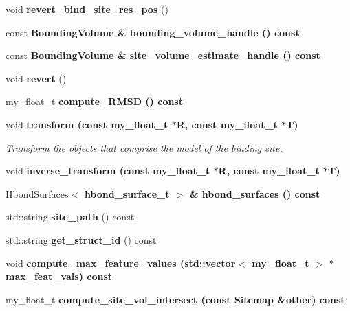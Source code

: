 \begin{CompactItemize}
\item 
void \textbf{revert\_\-bind\_\-site\_\-res\_\-pos} ()\label{classSimSite3D_1_1Sitemap_2411adae66ef848c5bfe67d55c07e672}

\item 
const \bf{Bounding\-Volume} \& \textbf{bounding\_\-volume\_\-handle} () const \label{classSimSite3D_1_1Sitemap_3ba92f5ed263d28b96b29085c197abed}

\item 
const \bf{Bounding\-Volume} \& \textbf{site\_\-volume\_\-estimate\_\-handle} () const \label{classSimSite3D_1_1Sitemap_ad6269d1f92809bbf093a0c6f6c8442a}

\item 
void \textbf{revert} ()\label{classSimSite3D_1_1Sitemap_85a7198a79dd727691347e20c5ffffef}

\item 
my\_\-float\_\-t \bf{compute\_\-RMSD} () const 
\item 
void \bf{transform} (const my\_\-float\_\-t $\ast$R, const my\_\-float\_\-t $\ast$T)\label{classSimSite3D_1_1Sitemap_5dc7a050ffc9ae70c203cb31e41b4b77}

\begin{CompactList}\small\item\em Transform the objects that comprise the model of the binding site. \item\end{CompactList}\item 
void \bf{inverse\_\-transform} (const my\_\-float\_\-t $\ast$R, const my\_\-float\_\-t $\ast$T)
\item 
Hbond\-Surfaces$<$ \bf{hbond\_\-surface\_\-t} $>$ \& \textbf{hbond\_\-surfaces} () const \label{classSimSite3D_1_1Sitemap_9e75ff867b2874ad6365c5c67c27a941}

\item 
std::string \textbf{site\_\-path} () const \label{classSimSite3D_1_1Sitemap_25f76f5d2bfbce099424bce78913d77b}

\item 
std::string \textbf{get\_\-struct\_\-id} () const \label{classSimSite3D_1_1Sitemap_325a5ef0a4b1949fd1d7eb8622a91802}

\item 
void \bf{compute\_\-max\_\-feature\_\-values} (std::vector$<$ my\_\-float\_\-t $>$ $\ast$max\_\-feat\_\-vals) const 
\item 
my\_\-float\_\-t \bf{compute\_\-site\_\-vol\_\-intersect} (const \bf{Sitemap} \&other) const 
\end{CompactItemize}
